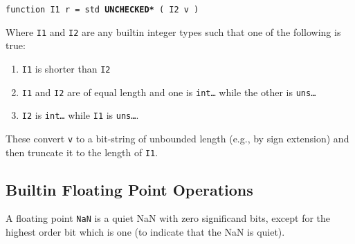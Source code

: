 \documentclass[12pt]{article}
\newcommand{\ttkey}[1]{{\tt \bfseries #1}}
\newenvironment{indpar}[1][0.3in]%
	{\begin{list}{}%
		     {\setlength{\itemsep}{0in}%
		      \setlength{\topsep}{0in}%
		      \setlength{\parsep}{1ex}%
		      \setlength{\labelwidth}{#1}%
		      \setlength{\leftmargin}{#1}%
		      \addtolength{\leftmargin}{\labelsep}}%
	 \item}%
	{\end{list}}
\begin{document}
{\tt function I1 r = std \ttkey{*UNCHECKED*} ( I2 v )}
\begin{indpar}
Where {\tt I1} and {\tt I2} are any builtin integer types
such that one of the following is true:
\begin{enumerate}
\item {\tt I1} is shorter than {\tt I2}
\item {\tt I1} and {\tt I2} are of equal length and one
is {\tt int\ldots} while the other is {\tt uns\ldots}
\item {\tt I2} is {\tt int\ldots} while {\tt I1} is {\tt uns\ldots}.
\end{enumerate}

These convert {\tt v} to a bit-string of unbounded length (e.g., by
sign extension) and
then truncate it to the length of {\tt I1}.
\end{indpar}

\subsection{Builtin Floating Point Operations}
\label{BUILTIN-FLOATING-POINT-OPERATIONS}

A floating point {\tt NaN}
is a quiet NaN with zero significand bits, except for the
highest order bit which is one (to indicate that the NaN is quiet).
\end{document}
